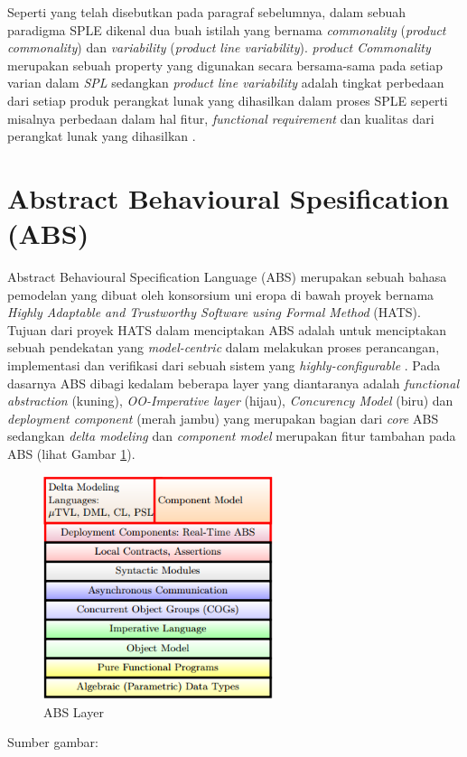 Seperti yang telah disebutkan pada paragraf sebelumnya, dalam sebuah paradigma SPLE dikenal dua buah istilah yang bernama \textit{commonality} (\textit{product commonality}) dan \textit{variability} (\textit{product line variability}). \textit{product Commonality} merupakan sebuah property yang digunakan secara bersama-sama pada setiap varian dalam \textit{SPL} sedangkan \textit{product line variability} adalah tingkat perbedaan dari setiap produk perangkat lunak yang dihasilkan dalam proses SPLE seperti misalnya perbedaan dalam hal fitur, \textit{functional requirement} dan kualitas dari perangkat lunak yang dihasilkan \cite{metzger2014software}.

\section{Abstract Behavioural Spesification (ABS)}

Abstract Behavioural Specification Language (ABS) merupakan sebuah bahasa pemodelan yang dibuat oleh konsorsium uni eropa di bawah proyek bernama \textit{Highly Adaptable and Trustworthy Software using Formal Method} (HATS). Tujuan dari proyek HATS dalam menciptakan ABS adalah untuk menciptakan sebuah pendekatan yang \textit{model-centric} dalam melakukan proses perancangan, implementasi dan verifikasi dari sebuah sistem yang \textit{highly-configurable} \citep{clarke2012variability}. Pada dasarnya ABS dibagi kedalam beberapa layer yang diantaranya adalah \textit{functional abstraction} (kuning), \textit{OO-Imperative layer} (hijau), \textit{Concurency Model} (biru) dan \textit{deployment component} (merah jambu) yang merupakan bagian dari \textit{core} ABS sedangkan \textit{delta modeling} dan \textit{component model} merupakan fitur tambahan pada ABS (lihat Gambar \ref{fig:absLayer}). \\

\begin{figure}
    \centering
    \includegraphics[width=0.6\textwidth]
        {img/abs-layers.png}
    \caption{ABS Layer}
    \label{fig:absLayer}
\end{figure}
\vspace{-0.8cm}
\begin{center}
{\small Sumber gambar: \citep{hahnle2013hats}}
\end{center}


